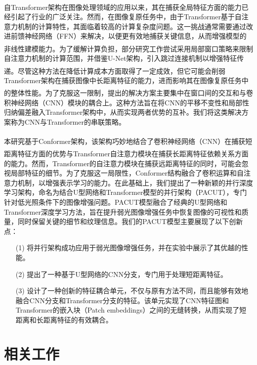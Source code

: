 \documentclass[a4paper]{ctexart}
\newcommand{\upcite}[1]{\rmfamily\textsuperscript{\textsuperscript{\cite{#1}}}}
\begin{document}
自Transformer架构\upcite{vaswani2017attention}在图像处理领域的应用以来\upcite{dosovitskiy2020image}，其在捕获全局特征方面的能力已经引起了行业的广泛关注。然而，在图像复原任务中，由于Transformer基于自注意力机制的计算特性，其面临着较高的计算复杂度问题。这一挑战通常需要通过改进前馈神经网络（FFN）来解决，以便更有效地捕获关键信息，从而增强模型的非线性建模能力\upcite{wang2022ultrahighdefinition}。为了缓解计算负担，部分研究工作尝试采用局部窗口策略来限制自注意力机制的计算范围，并借鉴U-Net架构，引入跳过连接机制以增强特征传递\upcite{wang2021uformer}。尽管这种方法在降低计算成本方面取得了一定成效，但它可能会削弱Transformer架构在捕获图像中长距离特征的能力，进而影响其在图像复原任务中的整体性能。为了克服这一限制，提出的解决方案\upcite{chen2023cross}主要集中在窗口间的交互和与卷积神经网络（CNN）模块的耦合上。这种方法旨在将CNN的平移不变性和局部性归纳偏差融入Transformer架构中，从而实现两者优势的互补。我们将这类解决方案称为CNN与Transformer的串联策略。

本研究基于Conformer架构\upcite{peng2021conformer}，该架构巧妙地结合了卷积神经网络（CNN）在捕获短距离特征\upcite{jain1991unsupervised, lowe2004distinctive, ojala2002multiresolution}方面的优势与Transformer自注意力模块在捕获长距离特征\upcite{lisin2005combining}依赖关系方面的能力。然而，Transformer的自注意力模块在捕获远距离特征的同时，可能会忽视局部特征的细节。为了克服这一局限性，Conformer结构融合了卷积运算和自注意力机制，以增强表示学习的能力。在此基础上，我们提出了一种新颖的并行深度学习架构，命名为结合U型网络和Transformer模型的并行架构（PACUT），专门针对低光照条件下的图像增强问题。PACUT模型融合了经典的U型网络和Transformer深度学习方法，旨在提升弱光图像增强任务中恢复图像的可视性和质量，同时保留关键的细节和纹理信息。我们的PACUT模型主要展现了以下创新点：

\begin{itemize}
	\item [(1)]
	将并行架构成功应用于弱光图像增强任务，并在实验中展示了其优越的性能。
	\item [(2)]
	提出了一种基于U型网络的CNN分支，专门用于处理短距离特征。
	\item [(3)]
	设计了一种创新的特征耦合单元，不仅与原有方法不同，而且能够有效地融合CNN分支和Transformer分支的特征。该单元实现了CNN特征图和Transformer的嵌入块（Patch embeddings）之间的无缝转换，从而实现了短距离和长距离特征的有效耦合。
\end{itemize}

\section{相关工作}
\end{document}
